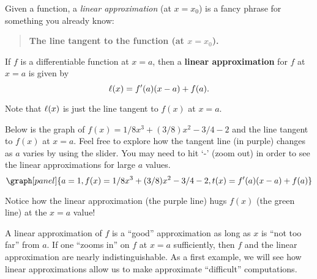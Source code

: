 \documentclass[handout,nooutcomes]{ximera}
\begin{document}
Given a function, a \textit{linear approximation} (at $x=x_0$) is a fancy phrase
for something you already know:
\begin{center}
\begin{quote}
  \textbf{The line tangent to the function (at $x=x_0$).}
\end{quote}
\end{center}


\begin{definition}
If $f$ is a differentiable function at $x=a$, then a \textbf{linear
  approximation} for $f$ at $x=a$ is given by
\[
\ell(x) = f'(a)(x-a) +f(a).
\]
\end{definition}


Note that $\ell(x)$ is just the line tangent to $f(x)$ at $x=a$.


\begin{example}
Below is the graph of $f(x) = 1/8x^3 + (3/8)x^2 -3/4 - 2$ and the line
tangent to $f(x)$ at $x=a$. Feel free to explore how the tangent line
(in purple) changes as $a$ varies by using the slider. You may need to
hit `-' (zoom out) in order to see the linear approximations for large $a$ values.
\[
\graph[panel]{a=1, f(x) = 1/8x^3 + (3/8)x^2 -3/4 - 2, t(x) = f'(a)(x-a)+ f(a)}
\]

Notice how the linear approximation (the purple line) hugs
$f(x)$ (the green line) at the $x=a$ value!
\end{example}

A linear approximation of $f$ is a ``good'' approximation as long as
$x$ is ``not too far'' from $a$.
If one ``zooms in'' on $f$ at $x=a$ sufficiently, then $f$ and the linear
approximation are nearly indistinguishable. As a first example, we
will see how linear approximations allow us to make approximate
``difficult'' computations.
\end{document}
